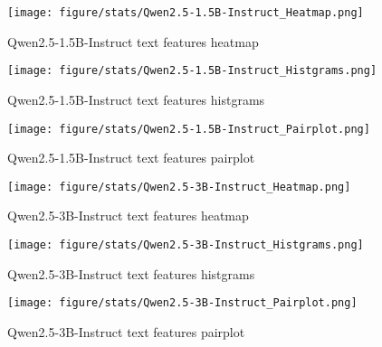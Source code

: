 \begin{figure}[H]
    \centering
    \texttt{[image: figure/stats/Qwen2.5-1.5B-Instruct\_Heatmap.png]}
    \caption{Qwen2.5-1.5B-Instruct text features heatmap}
    \label{fig:human_heatmap}
\end{figure}


\begin{figure}[H]
    \centering
    \texttt{[image: figure/stats/Qwen2.5-1.5B-Instruct\_Histgrams.png]}
    \caption{Qwen2.5-1.5B-Instruct text features histgrams}
    \label{fig:human_hist}
\end{figure}


\begin{figure}[H]
    \centering
    \texttt{[image: figure/stats/Qwen2.5-1.5B-Instruct\_Pairplot.png]}
    \caption{Qwen2.5-1.5B-Instruct text features pairplot}
    \label{fig:human_pairplot}
\end{figure}




\begin{figure}[H]
    \centering
    \texttt{[image: figure/stats/Qwen2.5-3B-Instruct\_Heatmap.png]}
    \caption{Qwen2.5-3B-Instruct text features heatmap}
    \label{fig:human_heatmap}
\end{figure}


\begin{figure}[H]
    \centering
    \texttt{[image: figure/stats/Qwen2.5-3B-Instruct\_Histgrams.png]}
    \caption{Qwen2.5-3B-Instruct text features histgrams}
    \label{fig:human_hist}
\end{figure}


\begin{figure}[H]
    \centering
    \texttt{[image: figure/stats/Qwen2.5-3B-Instruct\_Pairplot.png]}
    \caption{Qwen2.5-3B-Instruct text features pairplot}
    \label{fig:human_pairplot}
\end{figure}





